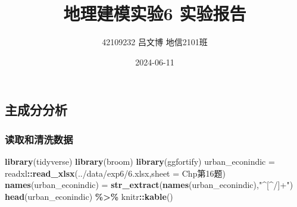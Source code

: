 \documentclass[
]{article}
\title{地理建模实验6 实验报告}
\author{42109232 \quad 吕文博 \quad 地信2101班}
\date{2024-06-11}
\newenvironment{Shaded}{\begin{snugshade}}{\end{snugshade}}
\newcommand{\AttributeTok}[1]{\textcolor[rgb]{0.13,0.29,0.53}{#1}}
\newcommand{\FunctionTok}[1]{\textcolor[rgb]{0.13,0.29,0.53}{\textbf{#1}}}
\newcommand{\NormalTok}[1]{#1}
\newcommand{\OtherTok}[1]{\textcolor[rgb]{0.56,0.35,0.01}{#1}}
\newcommand{\SpecialCharTok}[1]{\textcolor[rgb]{0.81,0.36,0.00}{\textbf{#1}}}
\newcommand{\StringTok}[1]{\textcolor[rgb]{0.31,0.60,0.02}{#1}}
\begin{document}
\maketitle

\subsection{主成分分析}\label{ux4e3bux6210ux5206ux5206ux6790}

\subsubsection{读取和清洗数据}\label{ux8bfbux53d6ux548cux6e05ux6d17ux6570ux636e}

\begin{Shaded}
\begin{Highlighting}[]
\FunctionTok{library}\NormalTok{(tidyverse)}
\FunctionTok{library}\NormalTok{(broom)}
\FunctionTok{library}\NormalTok{(ggfortify)}
\NormalTok{urban\_econindic }\OtherTok{=}\NormalTok{ readxl}\SpecialCharTok{::}\FunctionTok{read\_xlsx}\NormalTok{(}\StringTok{\textquotesingle{}../data/exp6/6.xlsx\textquotesingle{}}\NormalTok{,}\AttributeTok{sheet =} \StringTok{\textquotesingle{}Chp第16题\textquotesingle{}}\NormalTok{)}
\FunctionTok{names}\NormalTok{(urban\_econindic) }\OtherTok{=} \FunctionTok{str\_extract}\NormalTok{(}\FunctionTok{names}\NormalTok{(urban\_econindic),}\StringTok{"\^{}[\^{}/]+"}\NormalTok{)}
\FunctionTok{head}\NormalTok{(urban\_econindic) }\SpecialCharTok{\%\textgreater{}\%}\NormalTok{ knitr}\SpecialCharTok{::}\FunctionTok{kable}\NormalTok{()}
\end{Highlighting}
\end{Shaded}
\end{document}
